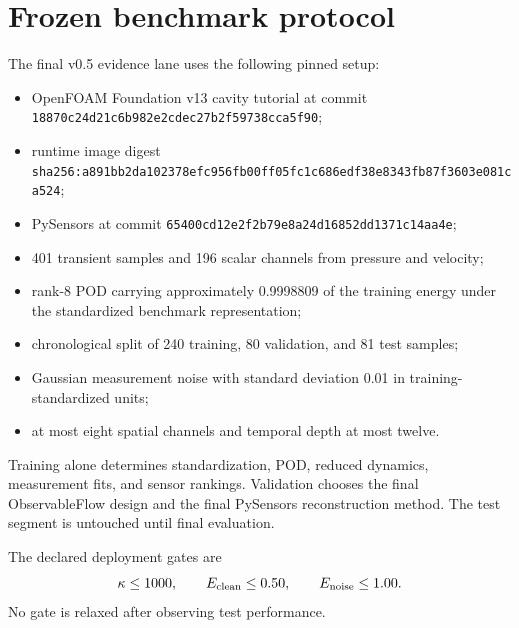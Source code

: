 \documentclass[11pt]{article}
\begin{document}
\section{Frozen benchmark protocol}
The final v0.5 evidence lane uses the following pinned setup:
\begin{itemize}
\item OpenFOAM Foundation v13 cavity tutorial at commit \texttt{18870c24d21c6b982e2cdec27b2f59738cca5f90};
\item runtime image digest \texttt{sha256:a891bb2da102378efc956fb00ff05fc1c686edf38e8343fb87f3603e081ca524};
\item PySensors at commit \texttt{65400cd12e2f2b79e8a24d16852dd1371c14aa4e};
\item 401 transient samples and 196 scalar channels from pressure and velocity;
\item rank-8 POD carrying approximately 0.9998809 of the training energy under the standardized benchmark representation;
\item chronological split of 240 training, 80 validation, and 81 test samples;
\item Gaussian measurement noise with standard deviation 0.01 in training-standardized units;
\item at most eight spatial channels and temporal depth at most twelve.
\end{itemize}
Training alone determines standardization, POD, reduced dynamics, measurement fits, and sensor rankings. Validation chooses the final ObservableFlow design and the final PySensors reconstruction method. The test segment is untouched until final evaluation.

The declared deployment gates are
\begin{equation}
\kappa\le1000,\qquad E_{\rm clean}\le0.50,\qquad E_{\rm noise}\le1.00.
\end{equation}
No gate is relaxed after observing test performance.
\end{document}
